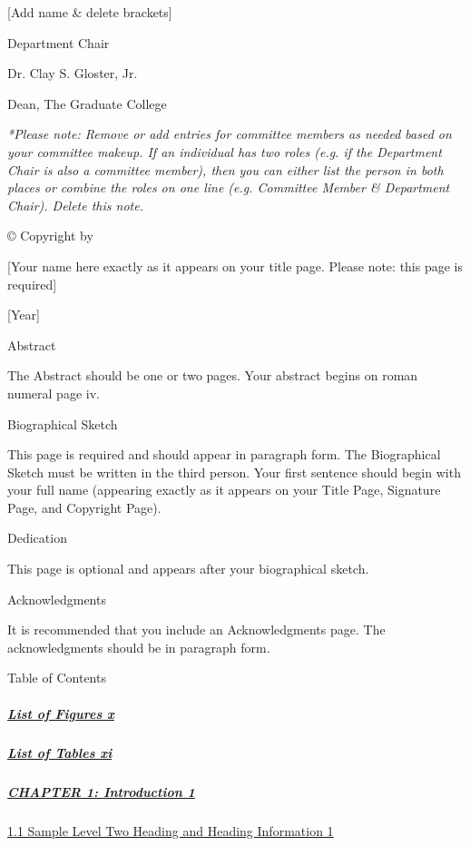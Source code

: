 {[}Add name \& delete brackets{]}

Department Chair

Dr. Clay S. Gloster, Jr.

Dean, The Graduate College

\emph{*Please note: Remove or add entries for committee members as
needed based on your committee makeup. If an individual has two roles
(e.g. if the Department Chair is also a committee member), then you can
either list the person in both places or combine the roles on one line
(e.g. Committee Member \& Department Chair). Delete this note.}

© Copyright by

{[}Your name here exactly as it appears on your title page. Please note:
this page is required{]}

{[}Year{]}

Abstract

The Abstract should be one or two pages. Your abstract begins on roman
numeral page iv.

Biographical Sketch

This page is required and should appear in paragraph form. The
Biographical Sketch must be written in the third person. Your first
sentence should begin with your full name (appearing exactly as it
appears on your Title Page, Signature Page, and Copyright Page).

Dedication

This page is optional and appears after your biographical sketch.

Acknowledgments

It is recommended that you include an Acknowledgments page. The
acknowledgments should be in paragraph form.

Table of Contents

\hypertarget{list-of-figures-x}{%
\subparagraph{\texorpdfstring{\protect\hyperlink{list-of-figures}{List
of Figures x}}{List of Figures x}}\label{list-of-figures-x}}

\hypertarget{list-of-tables-xi}{%
\subparagraph{\texorpdfstring{\protect\hyperlink{list-of-tables}{List of
Tables xi}}{List of Tables xi}}\label{list-of-tables-xi}}

\hypertarget{chapter-1-introduction-1}{%
\subparagraph{\texorpdfstring{\protect\hyperlink{chapter-1-introduction}{CHAPTER
1: Introduction
1}}{CHAPTER 1: Introduction 1}}\label{chapter-1-introduction-1}}

\protect\hyperlink{_Toc114562011}{1.1 Sample Level Two Heading and
Heading Information 1}

